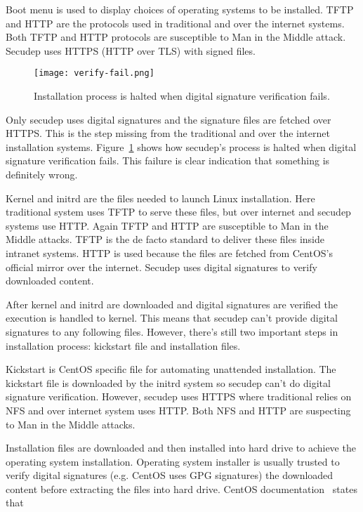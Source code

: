 Boot menu is used to display choices of operating systems to be
installed. TFTP and HTTP are the protocols used in traditional and
over the internet systems. Both TFTP and HTTP protocols are
susceptible to Man in the Middle attack. Secudep uses HTTPS (HTTP over
TLS) with signed files.

\begin{figure}[h]
  \texttt{[image: verify-fail.png]}
  \caption{Installation process is halted when digital signature
    verification fails.}
  \label{fig:verify-fail}
\end{figure}

Only secudep uses digital signatures and the signature files are
fetched over HTTPS. This is the step missing from the traditional and
over the internet installation systems. Figure~\ref{fig:verify-fail}
shows how secudep's process is halted when digital signature
verification fails. This failure is clear indication that something is
definitely wrong.

Kernel and initrd are the files needed to launch Linux
installation. Here traditional system uses TFTP to serve these files,
but over internet and secudep systems use HTTP. Again TFTP and HTTP
are susceptible to Man in the Middle attacks. TFTP is the de facto
standard to deliver these files inside intranet systems. HTTP is used
because the files are fetched from CentOS's official mirror over the
internet. Secudep uses digital signatures to verify downloaded content.

After kernel and initrd are downloaded and digital signatures are
verified the execution is handled to kernel. This means that secudep
can't provide digital signatures to any following files. However, there's
still two important steps in installation process: kickstart file and
installation files.

Kickstart is CentOS specific file for automating unattended
installation. The kickstart file is downloaded by the initrd system so
secudep can't do digital signature verification. However, secudep uses
HTTPS where traditional relies on NFS and over internet system uses
HTTP. Both NFS and HTTP are suspecting to Man in the Middle attacks.

Installation files are downloaded and then installed into hard drive
to achieve the operating system installation. Operating system
installer is usually trusted to verify digital signatures (e.g. CentOS
uses GPG signatures) the downloaded content before extracting the
files into hard drive. CentOS documentation~\cite{centos-gpg} states
that

